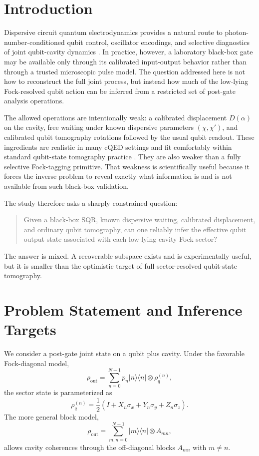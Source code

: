 \documentclass[11pt]{article}
\begin{document}
\section{Introduction}
Dispersive circuit quantum electrodynamics provides a natural route to
photon-number-conditioned qubit control, oscillator encodings, and selective
diagnostics of joint qubit-cavity dynamics \cite{blais2004cqed,heeres2015snap}.
In practice, however, a laboratory black-box gate may be available only through
its calibrated input-output behavior rather than through a trusted microscopic
pulse model. The question addressed here is not how to reconstruct the full
joint process, but instead how much of the low-lying Fock-resolved qubit action
can be inferred from a restricted set of post-gate analysis operations.

The allowed operations are intentionally weak: a calibrated displacement
$D(\alpha)$ on the cavity, free waiting under known dispersive parameters
$(\chi,\chi')$, and calibrated qubit tomography rotations followed by the usual
qubit readout. These ingredients are realistic in many cQED settings and fit
comfortably within standard qubit-state tomography practice
\cite{james2001measurement,lvovsky2009tomography}. They are also weaker than a
fully selective Fock-tagging primitive. That weakness is scientifically useful
because it forces the inverse problem to reveal exactly what information is and
is not available from such black-box validation.

The study therefore asks a sharply constrained question:
\begin{quote}
Given a black-box SQR, known dispersive waiting, calibrated displacement, and
ordinary qubit tomography, can one reliably infer the effective qubit output
state associated with each low-lying cavity Fock sector?
\end{quote}
The answer is mixed. A recoverable subspace exists and is experimentally useful,
but it is smaller than the optimistic target of full sector-resolved qubit-state
tomography.

\section{Problem Statement and Inference Targets}
We consider a post-gate joint state on a qubit plus cavity. Under the favorable
Fock-diagonal model,
\begin{equation}
\rho_{\mathrm{out}} =
\sum_{n=0}^{N-1} p_n |n\rangle\!\langle n| \otimes \rho_q^{(n)},
\label{eq:fockdiag}
\end{equation}
the sector state is parameterized as
\begin{equation}
\rho_q^{(n)} = \frac{1}{2}\left(I + X_n \sigma_x + Y_n \sigma_y + Z_n \sigma_z\right).
\label{eq:blochsector}
\end{equation}
The more general block model,
\begin{equation}
\rho_{\mathrm{out}} = \sum_{m,n=0}^{N-1} |m\rangle\!\langle n| \otimes A_{mn},
\label{eq:blockmodel}
\end{equation}
allows cavity coherences through the off-diagonal blocks $A_{mn}$ with
$m\neq n$.
\end{document}
